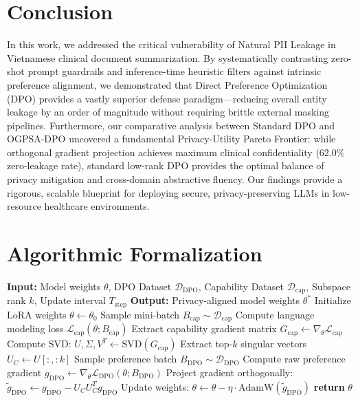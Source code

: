 \documentclass[11pt]{article}
\begin{document}
\section{Conclusion}
\label{sec:conclusion}

In this work, we addressed the critical vulnerability of Natural PII Leakage in Vietnamese clinical document summarization. By systematically contrasting zero-shot prompt guardrails and inference-time heuristic filters against intrinsic preference alignment, we demonstrated that Direct Preference Optimization (DPO) provides a vastly superior defense paradigm—reducing overall entity leakage by an order of magnitude without requiring brittle external masking pipelines. Furthermore, our comparative analysis between Standard DPO and OGPSA-DPO uncovered a fundamental Privacy-Utility Pareto Frontier: while orthogonal gradient projection achieves maximum clinical confidentiality (62.0\% zero-leakage rate), standard low-rank DPO provides the optimal balance of privacy mitigation and cross-domain abstractive fluency. Our findings provide a rigorous, scalable blueprint for deploying secure, privacy-preserving LLMs in low-resource healthcare environments.



\appendix
\onecolumn

\section{Algorithmic Formalization}
\label{sec:appendix_algorithms}

\begin{algorithm}[h]
\caption{Orthogonal Gradient Projection for Privacy Alignment (OGPSA-DPO)}
\label{alg:ogpsa}
\begin{algorithmic}[1]
\State \textbf{Input:} Model weights $\theta$, DPO Dataset $\mathcal{D}_{\text{DPO}}$, Capability Dataset $\mathcal{D}_{\text{cap}}$, Subspace rank $k$, Update interval $T_{\text{step}}$
\State \textbf{Output:} Privacy-aligned model weights $\theta^*$
\State Initialize LoRA weights $\theta \gets \theta_0$
        \State Sample mini-batch $B_{\text{cap}} \sim \mathcal{D}_{\text{cap}}$
        \State Compute language modeling loss $\mathcal{L}_{\text{cap}}(\theta; B_{\text{cap}})$
        \State Extract capability gradient matrix $G_{\text{cap}} \gets \nabla_\theta \mathcal{L}_{\text{cap}}$
        \State Compute SVD: $U, \Sigma, V^T \gets \text{SVD}(G_{\text{cap}})$
        \State Extract top-$k$ singular vectors $U_C \gets U[:, :k]$ 
    \EndIf
    \State Sample preference batch $B_{\text{DPO}} \sim \mathcal{D}_{\text{DPO}}$
    \State Compute raw preference gradient $g_{\text{DPO}} \gets \nabla_\theta \mathcal{L}_{\text{DPO}}(\theta; B_{\text{DPO}})$
    \State Project gradient orthogonally: $\tilde{g}_{\text{DPO}} \gets g_{\text{DPO}} - U_C U_C^T g_{\text{DPO}}$
    \State Update weights: $\theta \gets \theta - \eta \cdot \text{AdamW}(\tilde{g}_{\text{DPO}})$
\EndFor
\State \textbf{return} $\theta$
\end{algorithmic}
\end{algorithm}
\end{document}

